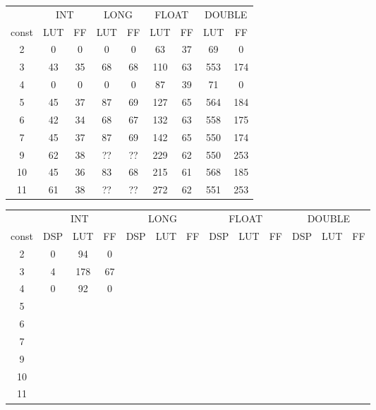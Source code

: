 \documentclass[10pt,a4paper,twoside]{article}
\author{Victor Lezaud}
\title{}
\begin{document}
\begin{tabular}{|c||c|c|c|c||c|c|c|c|}
    \hline
     & \multicolumn{2}{|c}{INT} & \multicolumn{2}{|c||}{LONG} & \multicolumn{2}{|c|}{FLOAT} &  \multicolumn{2}{|c|}{DOUBLE}\\
    const & LUT & FF & LUT & FF & LUT & FF & LUT & FF \\
    \hline
    2 & 0 & 0 & 0 & 0 & 63 & 37 & 69 & 0\\
    \hline
    3 & 43 & 35 & 68 & 68 & 110 & 63 & 553 & 174\\
    \hline
    4 & 0 & 0 & 0 & 0 & 87 & 39 & 71 & 0 \\
    \hline
    5 & 45 & 37 & 87 & 69 & 127 & 65 & 564 & 184\\
    \hline
    6 & 42 & 34 & 68 & 67 & 132 & 63 & 558 & 175\\
    \hline
    7 & 45 & 37 & 87 & 69 & 142 & 65 & 550 & 174\\
    \hline
    9 & 62 & 38 & ?? & ?? & 229 & 62 &  550 & 253 \\
    \hline
    10 & 45 & 36 & 83 & 68 & 215 & 61 & 568 & 185 \\
    \hline
    11 & 61 & 38 & ?? & ?? & 272 & 62 & 551 & 253 \\
    \hline
\end{tabular}

\begin{tabular}{|c||c|c|c|c|c|c||c|c|c|c|c|c|}
    \hline
     & \multicolumn{3}{|c}{INT} & \multicolumn{3}{|c||}{LONG} & \multicolumn{3}{|c|}{FLOAT} &  \multicolumn{3}{|c|}{DOUBLE}\\
    const & DSP & LUT & FF & DSP & LUT & FF & DSP & LUT & FF & DSP & LUT & FF \\
    \hline
    2 & 0 & 94 & 0 & &  &  &  &  & &  &  & \\
    \hline
    3 & 4 & 178 & 67 & &  &  &  &  & &  &  & \\
    \hline
    4 & 0 & 92 & 0 &  &  &  &  &  & &  &  & \\
    \hline
    5 &  &  &  &  &  &  &  &  & &  &  & \\
    \hline
    6 &  &  &  &  &  &  &  &  & &  &  & \\
    \hline
    7 &  &  &  &  &  &  &  &  & &  &  & \\
    \hline
    9 &  &  &  &  &  &  &  &  & &  &  & \\
    \hline
    10 &  &  &  &  &  &  &  &  & &  &  & \\
    \hline
    11 &  &  &  &  &  &  &  &  & &  &  & \\
    \hline
\end{tabular}
\end{document}
